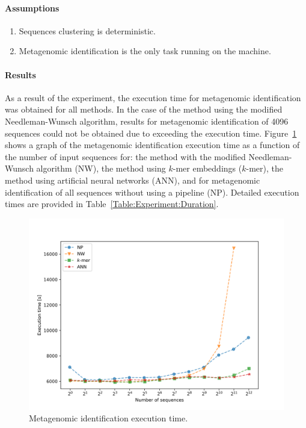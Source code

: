 \documentclass[pdflatex,sn-vancouver-num]{sn-jnl}%
\begin{document}
                \paragraph{Assumptions}
                \begin{enumerate}
                    \item {
                        Sequences clustering is deterministic.
                    }
                    \item {
                        Metagenomic identification is the only task running on the machine.
                    }
                \end{enumerate}

                \paragraph{Results}
                As a result of the experiment, the execution time for metagenomic identification was obtained for all methods. In the case of the method using the modified Needleman-Wunsch algorithm, results for metagenomic identification of 4096 sequences could not be obtained due to exceeding the execution time. Figure~\ref{Picture:Experiment:Duration} shows a graph of the metagenomic identification execution time as a function of the number of input sequences for: the method with the modified Needleman-Wunsch algorithm (NW), the method using $k$-mer embeddings ($k$-mer), the method using artificial neural networks (ANN), and for metagenomic identification of all sequences without using a pipeline (NP). Detailed execution times are provided in Table~\ref{Table:Experiment:Duration}.

                \begin{figure}[!htb]
                    \begin{center}
                        \includegraphics[width=\textwidth]{picture_experiment_duration.png}
                    \end{center}
                    \caption{
                        Metagenomic identification execution time.
                    }\label{Picture:Experiment:Duration}
                \end{figure}
\end{document}
